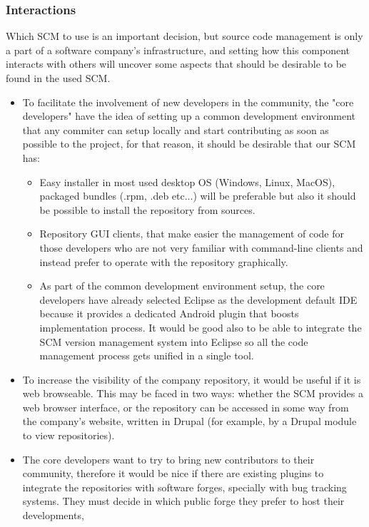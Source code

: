 \documentclass[a4paper,10pt]{article}
\begin{document}
\subsubsection{Interactions}
Which SCM to use is an important decision, but source code management is only a
part of a software company's infrastructure, and setting how this component
interacts with others will uncover some aspects that should be desirable to be
found in the used SCM.
\begin{itemize}
\item To facilitate the involvement of new developers in the community, the
"core developers" have the idea of setting up a common development environment
that any commiter can setup locally and start contributing as soon as possible
to the project, for that reason, it should be desirable that our SCM has:
 \begin{itemize}
  \item Easy installer in most used desktop OS (Windows, Linux, MacOS), packaged
bundles (.rpm, .deb etc...) will be preferable but also it should be possible
to install the repository from sources.
  \item Repository GUI clients, that make easier the management of code for
those developers who are not very familiar with command-line clients and instead
prefer to operate with the repository graphically.
  \item As part of the common development environment setup, the core developers
have already selected Eclipse as the development default IDE because it provides
a dedicated Android plugin\cite{AndroidPlugin} that boosts implementation
process. It would be good also to be able to integrate the SCM version
management system into Eclipse so all the code management process gets unified
in a single tool.
 \end{itemize}
\item To increase the visibility of the company repository, it would be useful
if it is web browseable. This may be faced in two ways: whether the SCM provides
a web browser interface, or the repository can be accessed in some way from the
company's website, written in Drupal\cite{Drupal} (for example, by a Drupal
module to view repositories).
\item The core developers want to try to bring new contributors to their
community, therefore it would be nice if there are existing plugins to integrate
the repositories with software forges, specially with bug tracking systems. They
must decide in which public forge they prefer to host their developments,

\end{itemize}
\end{document}

